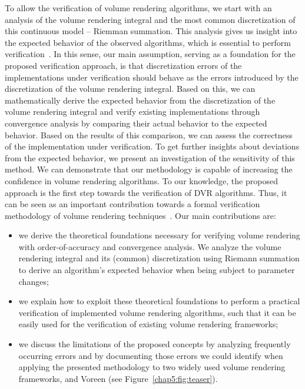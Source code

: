 To allow the verification of volume rendering algorithms, we start with an analysis of the volume rendering integral and the most common discretization of this continuous model -- Riemman summation. This analysis gives us insight into the expected behavior of the observed algorithms, which is essential to perform verification~\cite{159342}. In this sense, our main assumption, serving as a foundation for the proposed verification approach, is that discretization errors of the implementations under verification should behave as the errors introduced by 
the discretization of the volume rendering integral. 
Based on this, we can mathematically derive the expected behavior from the discretization of the volume rendering integral and verify existing implementations through convergence analysis by comparing their actual behavior to the expected behavior. 
%
Based on the results of this comparison, we can assess the correctness of the implementation under verification. To get further insights about deviations from the expected behavior, we present an investigation of the sensitivity of this method. 
%
We can demonstrate that our methodology is capable of increasing the confidence in volume rendering algorithms. To our knowledge, the proposed approach is the first step towards the verification of DVR algorithms. Thus, it can be seen as an important contribution towards a formal verification methodology of volume rendering techniques~\cite{roach98}.
%
Our main contributions are:
\begin{itemize}
\item we derive the theoretical foundations necessary for verifying volume rendering with order-of-accuracy and convergence analysis. We analyze the volume rendering integral and its (common) discretization using Riemann summation to derive an algorithm's expected behavior when being subject to parameter changes;
\item we explain how to exploit these theoretical foundations to perform a practical verification of implemented volume rendering algorithms, such that it can be easily used for the verification of existing volume rendering frameworks;
\item we discuss the limitations of the proposed concepts by analyzing frequently occurring errors and by documenting those errors we could identify when applying the presented methodology to two widely used volume rendering frameworks, 
 \cite{vtk} and Voreen \cite{MRMH09} (see Figure~\ref{chap5:fig:teaser}).
\end{itemize}

